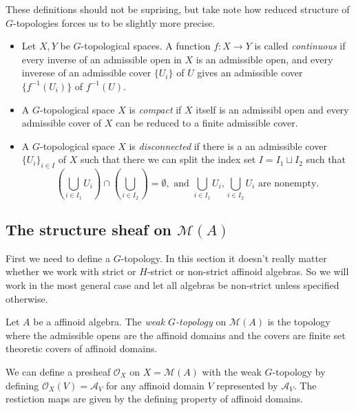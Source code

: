 \begin{definition}
	These definitions should not be suprising, but take note how reduced structure of $G$-topologies forces us to be slightly more precise.  
	\begin{itemize}
		\item  Let $X, Y$ be $G$-topological spaces. 
			A function $f: X \to Y$ is called \emph{continuous} if every inverse of an admissible open in $X$ is an admissible open, and every inverese of an admissible cover $\{U_i\} $ of $U$ gives an admissible cover $\{f^{-1}(U_i)\} $ of $f^{-1}(U)$. 
		\item A $G$-topological space $X$ is \emph{compact} if $X$ itself is an admissibl open and every admissible cover of $X$ can be reduced to a finite admissible cover. 
		\item A $G$-topological space $X$ is \emph{disconnected} if there is a an admissible cover $\{U_i\} _{i \in I}$ of $X$ such that there we can split the index set $I = I_1 \sqcup I_2$  such that \[
				\left(\bigcup_{i \in  I_1} U_i\right)\cap \left( \bigcup_{i \in I_2}  \right)  = \emptyset, \text{ and } \bigcup_{i \in I_1} U_i, \bigcup_{i \in I_2} U_i \text{ are nonempty}
		.\] 
	\end{itemize}
\end{definition}



\subsection{The structure sheaf on $\mathcal{M} (A)$} \label{sec:the_structure_sheaf_on_ma}

First we need to define a $G$-topology. In this section it doesn't really matter whether we work with strict or $H$-strict or non-strict affinoid algebras. So we will work in the most general case and let all algebras be non-strict unless specified otherwise.  

\begin{definition}
	Let $A$ be a affinoid algebra. 
	The \emph{weak $G$-topology} on $\mathcal{M} (A)$ is the topology where the admissible opens are the affinoid domains and the covers are finite set theoretic covers of affinoid domains. 
\end{definition}

We can define a presheaf $\mathcal{O}_X$ on $X =\mathcal{M} (A)$ with the weak  $G$-topology by defining $\mathcal{O}_X(V) = \mathcal{A} _V$ for any affinoid domain $V$ represented by $\mathcal{A}_V$.
The restiction maps are given by the defining property of affinoid domains.


